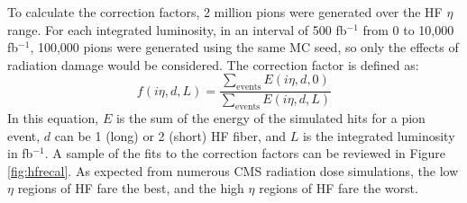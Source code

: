 			To calculate the correction factors, 2 million pions were generated over the HF $\eta$ range. For each integrated luminosity, in an interval of 500 fb$^{-1}$ from 0 to 10,000 fb$^{-1}$, 100,000 pions were generated using the same MC seed, so only the effects of radiation damage would be considered.  The correction factor is defined as:
			\begin{equation}
				f(i\eta, d, L) = \frac{\sum_{\text{events}} E(i\eta, d, 0)}{\sum_{\text{events}} E(i\eta, d, L)} \label{eq:corr}
			\end{equation}
			In this equation, $E$ is the sum of the energy of the simulated hits for a pion event, $d$ can be 1 (long) or 2 (short) HF fiber, and $L$ is the integrated luminosity in fb$^{-1}$.  A sample of the fits to the correction factors can be reviewed in Figure \ref{fig:hfrecal}.  As expected from numerous CMS radiation dose simulations, the low $\eta$ regions of HF fare the best, and the high $\eta$ regions of HF fare the worst.
			
